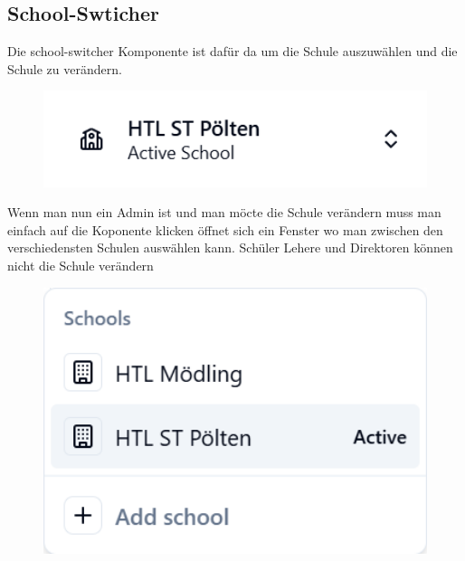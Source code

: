 \begin{inhalt}
\subsection{School-Swticher}

Die school-switcher Komponente ist dafür da um die Schule auszuwählen und die Schule zu verändern.

\begin{figure}[!htb]
\centering
\includegraphics[width=1\textwidth]{files/Thomas/pics/Website/Sidebar/school-switcher/school-switcher.png}
\caption[Bildbezeichnung für Abbildungsverzeichnis]{}
\label{fig:gehaeuse_internet_bild}
\end{figure}

\clearpage

Wenn man nun ein Admin ist und man möcte die Schule verändern muss man einfach auf die Koponente klicken öffnet sich ein Fenster wo man zwischen den verschiedensten Schulen auswählen kann. Schüler Lehere und Direktoren können nicht die Schule verändern

\begin{figure}[!htb]
\centering
\includegraphics[width=1\textwidth]{files/Thomas/pics/Website/Sidebar/school-switcher/school-switcher-open.png}
\caption[Bildbezeichnung für Abbildungsverzeichnis]{}
\label{fig:gehaeuse_internet_bild}
\end{figure}


\end{inhalt}

